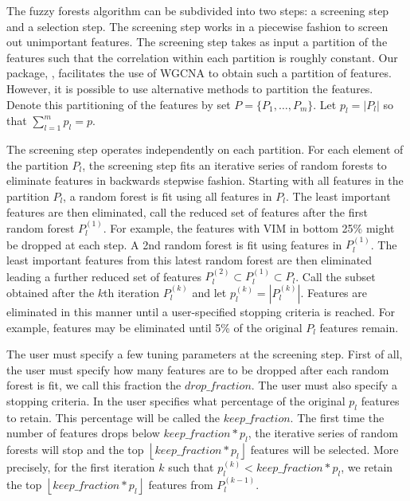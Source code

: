 \documentclass[article,shortnames]{jss}
\begin{document}
The fuzzy forests algorithm can be subdivided into two steps: a screening step and a selection step.  The screening step works in a piecewise fashion
to screen out unimportant features.  The screening step takes as input a partition of the features such that the correlation within each partition is 
roughly constant.  Our package, , facilitates the use of WGCNA to obtain such a partition of features.  However, 
it is possible to use alternative methods to partition the features.  Denote this partitioning of the features by set $P=\{P_{1},\ldots,P_{m}\}$.
Let $p_{l}=|P_{l}|$ so that $\sum_{l=1}^{m}p_{l}=p$.

The screening step operates independently on each partition.  For each element of the partition $P_{l}$, the screening step fits an iterative series of
random forests to eliminate features in backwards stepwise fashion.  Starting with all features in the partition $P_{l}$, a random forest is fit using all
features in $P_{l}$.  The least important features are then eliminated, call the reduced set of features after the first random forest $P_{l}^{(1)}$.  
For example, the features with VIM in bottom 25\% might be dropped at each step. 
A 2nd random forest is fit using features in $P_{l}^{(1)}$.  The least important features from this latest random forest are then eliminated leading a
further reduced set of features $P_{l}^{(2)} \subset P_{l}^{(1)} \subset P_{l}$.  Call the subset obtained after the $k$th iteration $P_{l}^{(k)}$ and let
$p^{(k)}_{l}=|P_{l}^{(k)}|$.
Features are eliminated in this manner until a user-specified 
stopping criteria is reached.  For example, features may be eliminated until 5\% of the original $P_{l}$ features remain.  

The user must specify a few tuning parameters at the screening step.  First of all, the user must specify how many features are to be dropped after 
each random forest is fit, we call this fraction the $drop\_fraction$.   The user must also specify a stopping criteria. 
In  the user specifies what percentage of the original $p_{l}$ features to retain.  This percentage will be called the $keep\_fraction$.  
The first time the number of features drops below $keep\_fraction*p_{l}$, the iterative series of random forests will stop and the top 
$\left\lfloor keep\_fraction*p_{l} \right\rfloor$ features will be selected.  More precisely, for the first iteration $k$ such that $p^{(k)}_{l}<keep\_fraction*p_{l}$, 
we retain the top $\left\lfloor keep\_fraction*p_{l} \right\rfloor$ features from $P_{l}^{(k-1)}$.         
\end{document}
